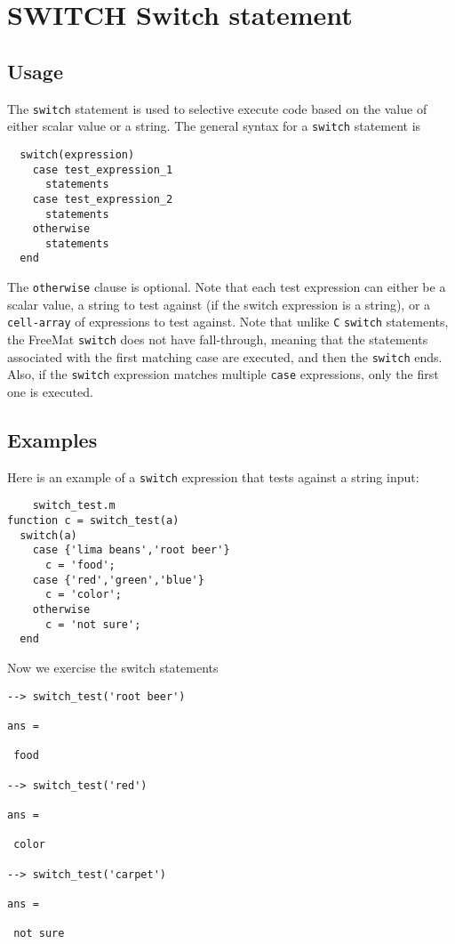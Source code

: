 \section{SWITCH Switch statement}

\subsection{Usage}

The \verb|switch| statement is used to selective execute code
based on the value of either scalar value or a string.
The general syntax for a \verb|switch| statement is
\begin{verbatim}
  switch(expression)
    case test_expression_1
      statements
    case test_expression_2
      statements
    otherwise
      statements
  end
\end{verbatim}
The \verb|otherwise| clause is optional.  Note that each test
expression can either be a scalar value, a string to test
against (if the switch expression is a string), or a 
\verb|cell-array| of expressions to test against.  Note that
unlike \verb|C| \verb|switch| statements, the FreeMat \verb|switch|
does not have fall-through, meaning that the statements
associated with the first matching case are executed, and
then the \verb|switch| ends.  Also, if the \verb|switch| expression
matches multiple \verb|case| expressions, only the first one
is executed.
\subsection{Examples}

Here is an example of a \verb|switch| expression that tests
against a string input:
\begin{verbatim}
    switch_test.m
function c = switch_test(a)
  switch(a)
    case {'lima beans','root beer'}
      c = 'food';
    case {'red','green','blue'}
      c = 'color';
    otherwise
      c = 'not sure';
  end
\end{verbatim}
Now we exercise the switch statements
\begin{verbatim}
--> switch_test('root beer')

ans = 

 food

--> switch_test('red')

ans = 

 color

--> switch_test('carpet')

ans = 

 not sure
\end{verbatim}
